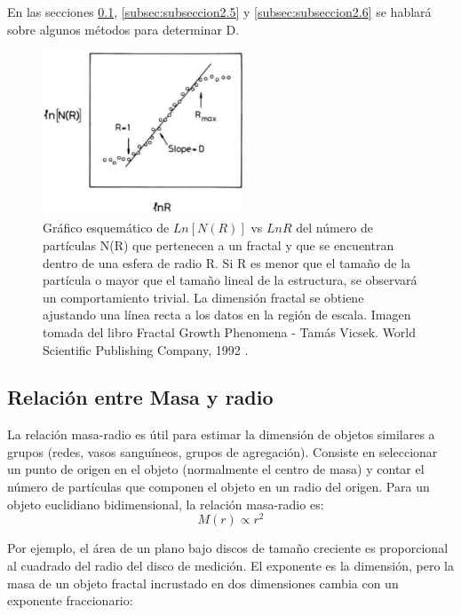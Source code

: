 \documentclass[11pt]{article}
\begin{document}
En las secciones \ref{subsec:subseccion2.4}, \ref{subsec:subseccion2.5} y \ref{subsec:subseccion2.6} se hablar\'{a} sobre algunos m\'{e}todos para determinar D. 
  
\begin{figure}[h!]
\vspace{1cm}
\centering
{\includegraphics[width=6cm]{Vicsek-Fractal} \par}
\caption{ Gráfico esquem\'{a}tico de $Ln[N(R)]$ vs $Ln R$  del número de partículas N(R) que pertenecen a un fractal y que se encuentran dentro de una esfera de radio R. Si R es menor que el tamaño de la partícula o mayor que el tamaño lineal de la estructura, se observar\'{a} un comportamiento trivial. La dimensión fractal se obtiene ajustando una línea recta a los datos en la región de escala. Imagen tomada del libro Fractal Growth Phenomena - Tam\'{a}s Vicsek. World Scientific Publishing Company, 1992 \cite{Vicsek1992}.}
\label{fig:Vicsek-Fractal}
\end{figure}
 

\subsection{Relaci\'{o}n entre Masa y radio}
\label{subsec:subseccion2.4}

La relaci\'{o}n masa-radio es \'{u}til para estimar la dimensi\'{o}n de objetos similares a grupos (redes, vasos sangu\'{i}neos, grupos de agregaci\'{o}n). Consiste en seleccionar un punto de origen en el objeto (normalmente el centro de masa) y contar el n\'{u}mero de part\'{i}culas que componen el objeto en un radio del origen. Para un objeto euclidiano bidimensional, la relaci\'{o}n masa-radio es:
\begin{equation}
M(r) \propto r^{2}
\end{equation}

Por ejemplo, el \'{a}rea de un plano bajo discos de tamaño creciente es proporcional al cuadrado del radio del disco de medici\'{o}n. El exponente es la dimensi\'{o}n, pero la masa de un objeto fractal incrustado en dos dimensiones cambia con un exponente fraccionario:
\end{document}
